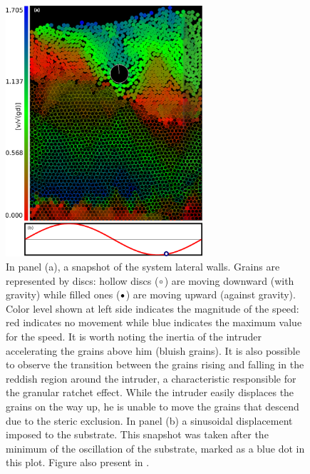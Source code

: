 
\begin{figure}
    \centering
    \includegraphics[width=0.65\textwidth]{04-figuras/BNE.pdf}
    \caption[BNE snapshot.]{In panel (a), a snapshot of the system lateral walls. Grains are represented by discs: hollow discs ($\textcolor{black}{\circ}$) are moving downward (with gravity) while filled ones ($\textcolor{black}{\bullet}$) are moving upward (against gravity). Color level shown at left side indicates the magnitude of the speed: red indicates no movement while blue indicates the maximum value for the speed. It is worth noting the inertia of the intruder accelerating the grains above him (bluish grains). It is also possible to observe the transition between the grains rising and falling in the reddish region around the intruder, a characteristic responsible for the granular ratchet effect. While the intruder easily displaces the grains on the way up, he is unable to move the grains that descend due to the steric exclusion. In panel (b) a sinusoidal displacement imposed to the substrate. This snapshot was taken after the minimum of the oscillation of the substrate, marked as a blue dot in this plot. Figure also present in \cite{Large-deviation_quantification_of_boundary_conditions_on_the_Brazil_nut_effect}.}
    \label{fig:BNE}
\end{figure}

